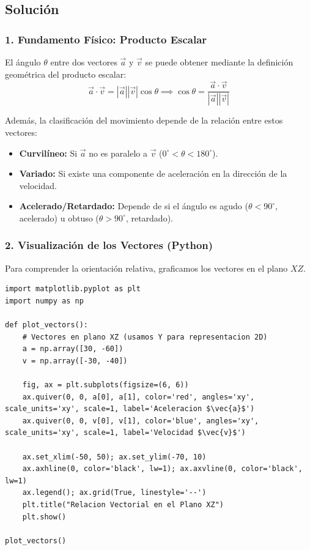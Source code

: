 \documentclass[12pt, a4paper]{article}
\begin{document}
\subsection*{Solución}

\subsubsection*{1. Fundamento Físico: Producto Escalar}

El ángulo $\theta$ entre dos vectores $\vec{a}$ y $\vec{v}$ se puede obtener mediante la definición geométrica del producto escalar:
\begin{equation}
    \vec{a} \cdot \vec{v} = |\vec{a}| |\vec{v}| \cos \theta \implies \cos \theta = \frac{\vec{a} \cdot \vec{v}}{|\vec{a}| |\vec{v}|}
\end{equation}

Además, la clasificación del movimiento depende de la relación entre estos vectores:
\begin{itemize}
    \item \textbf{Curvilíneo:} Si $\vec{a}$ no es paralelo a $\vec{v}$ ($0^\circ < \theta < 180^\circ$).
    \item \textbf{Variado:} Si existe una componente de aceleración en la dirección de la velocidad.
    \item \textbf{Acelerado/Retardado:} Depende de si el ángulo es agudo ($\theta < 90^\circ$, acelerado) u obtuso ($\theta > 90^\circ$, retardado).
\end{itemize}

\subsubsection*{2. Visualización de los Vectores (Python)}

Para comprender la orientación relativa, graficamos los vectores en el plano $XZ$.


\begin{lstlisting}
import matplotlib.pyplot as plt
import numpy as np

def plot_vectors():
    # Vectores en plano XZ (usamos Y para representacion 2D)
    a = np.array([30, -60])
    v = np.array([-30, -40])
    
    fig, ax = plt.subplots(figsize=(6, 6))
    ax.quiver(0, 0, a[0], a[1], color='red', angles='xy', scale_units='xy', scale=1, label='Aceleracion $\vec{a}$')
    ax.quiver(0, 0, v[0], v[1], color='blue', angles='xy', scale_units='xy', scale=1, label='Velocidad $\vec{v}$')
    
    ax.set_xlim(-50, 50); ax.set_ylim(-70, 10)
    ax.axhline(0, color='black', lw=1); ax.axvline(0, color='black', lw=1)
    ax.legend(); ax.grid(True, linestyle='--')
    plt.title("Relacion Vectorial en el Plano XZ")
    plt.show()

plot_vectors()
\end{lstlisting}
\end{document}
